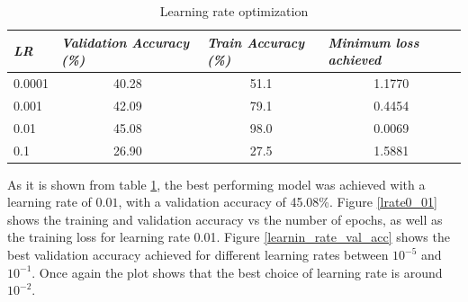 \documentclass[12pt,twoside]{article}
\begin{document}
\begin{table}[!htbp]
\centering
\label{my-label}
\begin{tabular}{|l|c|c|c|}
\hline
\textit{\textbf{LR}} & \multicolumn{1}{l|}{\textit{\textbf{Validation Accuracy (\%)}}} & \multicolumn{1}{l|}{\textit{\textbf{Train Accuracy (\%)}}} & \multicolumn{1}{l|}{\textit{\textbf{Minimum loss achieved}}} \\ \hline
0.0001                          & 40.28                                                           & 51.1                                                       & 1.1770                                                       \\ \hline
0.001                           & 42.09                                                           & 79.1                                                       & 0.4454                                                       \\ \hline
0.01                            & 45.08                                                           & 98.0                                                       & 0.0069                                                       \\ \hline
0.1                             & 26.90                                                           & 27.5                                                       & 1.5881                                                       \\ \hline
\end{tabular}
\caption{Learning rate optimization}
\label{Learning rate optimization}
\end{table}

As it is shown from table \ref{Learning rate optimization}, the best performing model was achieved with a learning rate of $0.01$, with a validation accuracy of 45.08\%.
Figure \ref{lrate0_01} shows the training and validation accuracy vs the number of epochs, as well as the training loss for learning rate 0.01.
Figure \ref{learnin_rate_val_acc} shows the best validation accuracy achieved for different learning rates between $10^{-5}$ and $10^{-1}$. Once again the plot shows that the best choice of learning rate is around $10^{-2}$.
\end{document}
